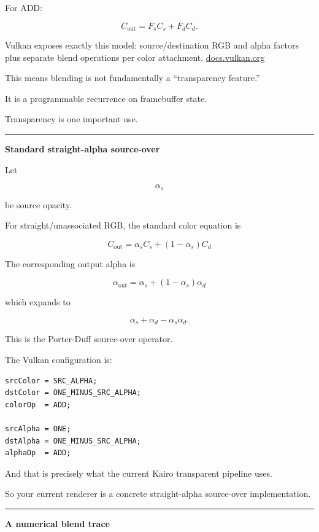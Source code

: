 For ADD:

\[
C_{\text{out}}
=
F_sC_s+F_dC_d.
\]

Vulkan exposes exactly this model: source/destination RGB and alpha factors plus separate blend operations per color attachment. \href{https://docs.vulkan.org/spec/latest/chapters/framebuffer.html?utm_source=chatgpt.com}{docs.vulkan.org}

This means blending is not fundamentally a ``transparency feature.''

It is a programmable recurrence on framebuffer state.

Transparency is one important use.

\begin{center}\rule{0.5\linewidth}{0.5pt}\end{center}

\textbf{Standard straight-alpha source-over}

Let

\[
\alpha_s
\]

be source opacity.

For straight/unassociated RGB, the standard color equation is

\[
\boxed{
C_{\text{out}}
=
\alpha_s C_s
+
(1-\alpha_s)C_d
}
\]

The corresponding output alpha is

\[
\boxed{
\alpha_{\text{out}}
=
\alpha_s+
(1-\alpha_s)\alpha_d
}
\]

which expands to

\[
\alpha_s+\alpha_d-\alpha_s\alpha_d.
\]

This is the Porter-Duff source-over operator.

The Vulkan configuration is:

\begin{verbatim}
srcColor = SRC_ALPHA;
dstColor = ONE_MINUS_SRC_ALPHA;
colorOp  = ADD;

srcAlpha = ONE;
dstAlpha = ONE_MINUS_SRC_ALPHA;
alphaOp  = ADD;
\end{verbatim}

And that is precisely what the current Kairo transparent pipeline uses.

So your current renderer is a concrete straight-alpha source-over implementation.

\begin{center}\rule{0.5\linewidth}{0.5pt}\end{center}

\textbf{A numerical blend trace}

